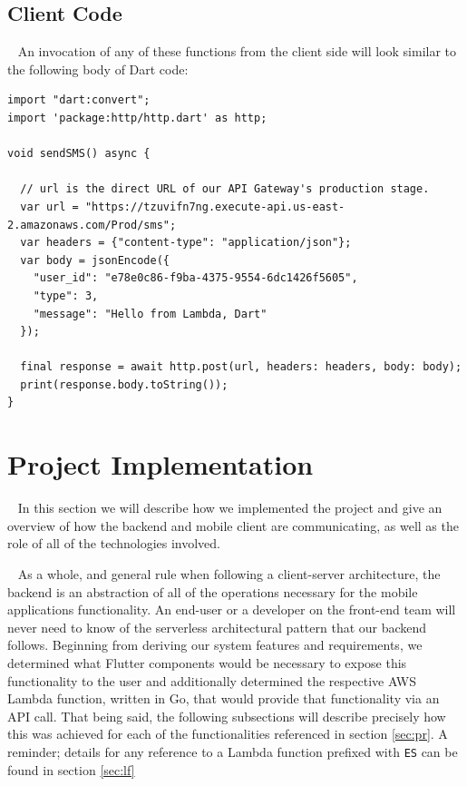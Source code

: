 \documentclass[10pt, a4paper]{article}
\begin{document}
\subsection{Client Code} 
\par ~ An invocation of any of these functions from the client side will look similar to the following body of Dart code:
\begin{lstlisting}
import "dart:convert";
import 'package:http/http.dart' as http;

void sendSMS() async {

  // url is the direct URL of our API Gateway's production stage.
  var url = "https://tzuvifn7ng.execute-api.us-east-2.amazonaws.com/Prod/sms";
  var headers = {"content-type": "application/json"};
  var body = jsonEncode({
    "user_id": "e78e0c86-f9ba-4375-9554-6dc1426f5605",
    "type": 3,
    "message": "Hello from Lambda, Dart"
  });

  final response = await http.post(url, headers: headers, body: body);
  print(response.body.toString());
}
\end{lstlisting}


\section{Project Implementation}
\par ~ In this section we will describe how we implemented the project and give an overview of how the backend and mobile client are communicating, as well as the role of all of the technologies involved. 
\par ~ As a whole, and general rule when following a client-server architecture, the backend is an abstraction of all of the operations necessary for the mobile applications functionality. An end-user or a developer on the front-end team will never need to know of the serverless architectural pattern \cite{one} that our backend follows. Beginning from deriving our system features and requirements, we determined what Flutter components would be necessary to expose this functionality to the user and additionally determined the respective AWS Lambda function, written in Go, that would provide that functionality via an API call. That being said, the following subsections will describe precisely how this was achieved for each of the functionalities referenced in section \ref{sec:pr}. A reminder; details for any reference to a Lambda function prefixed with \texttt{ES} can be found in section \ref{sec:lf} 
\end{document}
